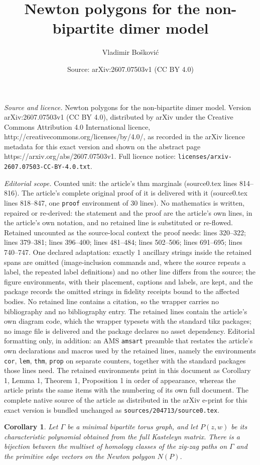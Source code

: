 \documentclass[10pt,a4paper]{amsart}
\title{Newton polygons for the non-bipartite dimer model}
\author{Vladimir Bo\v{s}kovi\'c}
\date{Source: arXiv:2607.07503v1 (CC BY 4.0)}
\newtheorem{cor}{Corollary}
\begin{document}
\maketitle

\noindent\emph{Source and licence.} Newton polygons for the non-bipartite dimer model. Version arXiv:2607.07503v1 (CC BY 4.0), distributed by arXiv under the Creative Commons Attribution 4.0 International licence, http://creativecommons.org/licenses/by/4.0/, as recorded in the arXiv licence metadata for this exact version and shown on the abstract page https://arxiv.org/abs/2607.07503v1. Full licence notice: \texttt{licenses/arxiv-2607.07503-CC-BY-4.0.txt}.\par\smallskip

\noindent\textit{Editorial scope.} Counted unit: the article's thm marginals (source0.tex lines 814--816). The article's complete original proof of it is delivered with it (source0.tex lines 818--847, one \texttt{proof} environment of 30 lines). No mathematics is written, repaired or re-derived: the statement and the proof are the article's own lines, in the article's own notation, and no retained line is substituted or re-flowed.  Retained uncounted as the source-local context the proof needs: lines 320--322; lines 379--381; lines 396--400; lines 481--484; lines 502--506; lines 691--695; lines 740--747.  One declared adaptation: exactly 1 ancillary strings inside the retained spans are omitted (image-inclusion commands and, where the source repeats a label, the repeated label definitions) and no other line differs from the source; the figure environments, with their placement, captions and labels, are kept, and the package records the omitted strings in fidelity receipts bound to the affected bodies.  No retained line contains a citation, so the wrapper carries no bibliography and no bibliography entry.  The retained lines contain the article's own diagram code, which the wrapper typesets with the standard tikz packages; no image file is delivered and the package declares no asset dependency.  Editorial formatting only, in addition: an AMS \texttt{amsart} preamble that restates the article's own declarations and macros used by the retained lines, namely the environments \texttt{cor}, \texttt{lem}, \texttt{thm}, \texttt{prop} on separate counters, together with the standard packages those lines need.  The retained environments print in this document as Corollary 1, Lemma 1, Theorem 1, Proposition 1 in order of appearance, whereas the article prints the same items with the numbering of its own full document.  The complete native source of the article as distributed in the arXiv e-print for this exact version is bundled unchanged as \texttt{sources/204713/source0.tex}.
\begin{cor} \label{NPs and homology classes}
    Let $\Gamma$ be a minimal bipartite torus graph, and let $P(z,w)$ be its characteristic polynomial obtained from the full Kasteleyn matrix. There is a bijection between the multiset of homology classes of the zig-zag paths on $\Gamma$ and the primitive edge vectors on the Newton polygon $N(P)$. 
\end{cor}
\end{document}
